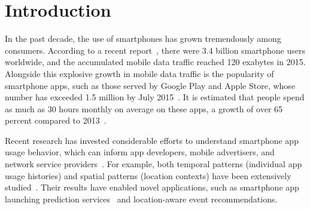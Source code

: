 \section{Introduction}\label{intro}

In the past decade, the use of smartphones has grown tremendously among consumers.
According to a recent report~\cite{Ericsson}, there were 3.4 billion smartphone users worldwide,
and the accumulated mobile data traffic reached 120 exabytes in 2015.
Alongside this explosive growth in mobile data traffic is the popularity of smartphone apps, such as those served by Google Play and Apple Store,
whose number has exceeded 1.5 million by July 2015~\cite{Statista}.
It is estimated that people spend as much as 30 hours monthly on average on these apps,
a growth of over 65 percent compared to 2013~\cite{Nielsen}.

Recent research has invested considerable efforts to understand smartphone app usage behavior, which can inform app developers, mobile advertisers, and network service providers~\cite{xu2011identifying,yang2015characterizing}.
For example, both temporal patterns (\eg individual app usage histories) and
spatial patterns (\eg location contexts) have been extensively studied~\cite{meng2014analyzing}.
Their results have enabled novel applications,
such as smartphone app launching prediction services~\cite{yan2012fast}
and location-aware event recommendations.

